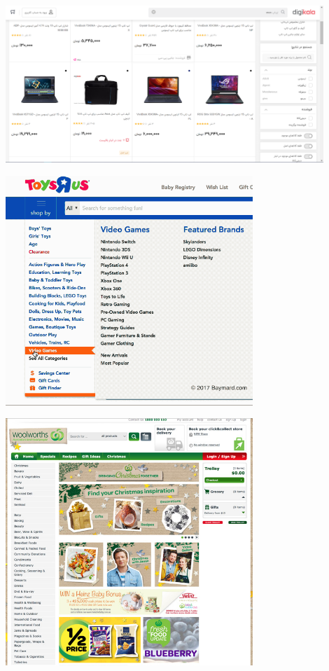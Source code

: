 \documentclass[]{article}
\begin{document}
\begin{center}
\includegraphics[width=0.9\textwidth]{images/image19.png}
\end{center}



\begin{center}
\includegraphics[width=0.7\textwidth]{images/image17.png}
\end{center}



\begin{center}
\includegraphics[width=0.7\textwidth]{images/image18.png}
\end{center}
\end{document}
